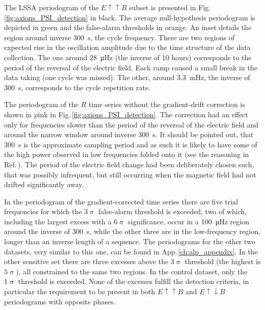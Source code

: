 The LSSA periodogram of the $E \uparrow \uparrow B$ subset is presented in Fig.\,\ref{fig:axions_PSI_detection} in black. The average null-hypothesis periodogram is depicted in green and the false-alarm thresholds in orange. An inset details the region around inverse \SI{300}{\second}, the cycle frequency.
There are two regions of expected rise in the oscillation amplitude due to the time structure of the data collection.
The one around \SI{28}{\micro\hertz} (the inverse of 10 hours) corresponds to the period of the reversal of the electric field. Each ramp caused a small break in the data taking (one cycle was missed).
The other, around \SI{3.3}{\milli\hertz}, the inverse of \SI{300}{\second}, corresponds to the cycle repetition rate.

The periodogram of the $R$ time series without the gradient-drift correction is shown in pink in Fig.\,\ref{fig:axions_PSI_detection}.
The correction had an effect only for frequencies slower than the period of the reversal of the electric field and around the narrow window around inverse \SI{300}{\second}.
It should be pointed out, that \SI{300}{\second} is the approximate sampling period and as such it is likely to have some of the high power observed in low frequencies folded onto it (see the reasoning in Ref.\,\cite{Shannon1949}).
The period of the electric field change had been deliberately chosen such, that was possibly infrequent, but still occurring when the magnetic field had not drifted significantly away.

In the periodogram of the gradient-corrected time series there are five
trial frequencies for which the $3\upsigma$ false-alarm threshold is exceeded,
two of which, including the largest excess with a $6\upsigma$ significance, occur in a \SI{100}{\micro\hertz} region around the inverse of \SI{300}{\second}, while the other three are in the low-frequency region, longer than an inverse length of a sequence.
 The periodograms for the other two datasets, very similar to this one, can be found in App.\,\ref{ch:alp_appendix}.
In the other sensitive set there are three excesses above the $3\upsigma$ threshold (the highest is $5\upsigma$), all constrained to the same two regions. In the control dataset, only the $1\upsigma$ threshold is exceeded. None of the excesses fulfill the detection criteria, in particular the requirement to be present in both $E \uparrow \uparrow B$ and $E \uparrow \downarrow B$ periodograms with opposite phases.

